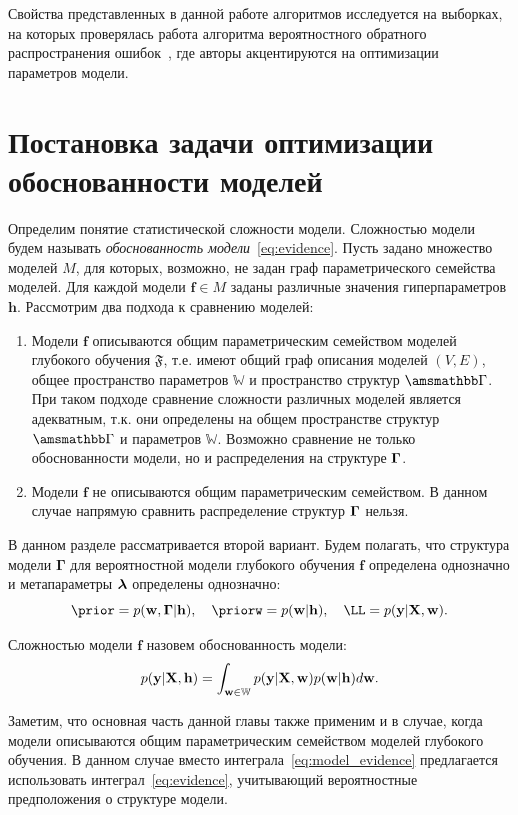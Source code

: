 Свойства представленных в данной работе  алгоритмов исследуется на выборках, на которых проверялась работа алгоритма вероятностного обратного распространения ошибок~\cite{pbp}, где авторы акцентируются на оптимизации параметров модели. 


\section{Постановка задачи оптимизации обоснованности моделей}
Определим понятие статистической сложности модели. Сложностью модели будем называть \textit{обоснованность модели}~\eqref{eq:evidence}.
Пусть задано множество моделей $M$, для которых, возможно, не задан граф параметрического семейства моделей.
Для каждой модели $\mathbf{f} \in {M}$ заданы различные значения гиперпараметров $\mathbf{h}$. 
Рассмотрим два подхода к сравнению моделей:
\begin{enumerate}
\item Модели $\mathbf{f}$ описываются общим параметрическим семейством моделей глубокого обучения $\mathfrak{F}$, т.е. имеют общий граф описания моделей $(V,E)$, общее пространство параметров $\mathbb{W}$ и пространство структур $\Gb$. При таком подходе сравнение сложности различных моделей является  адекватным, т.к. они определены на общем пространстве структур $\Gb$ и параметров $\mathbb{W}$. Возможно сравнение не только обоснованности модели, но и распределения на структуре $\boldsymbol{\Gamma}$.  
\item Модели $\mathbf{f}$  не описываются общим параметрическим семейством. В данном случае напрямую сравнить распределение структур $\boldsymbol{\Gamma}$ нельзя.
\end{enumerate}
В данном разделе рассматривается второй вариант. Будем полагать, что структура модели $\boldsymbol{\Gamma}$ для вероятностной модели глубокого обучения $\mathbf{f}$ определена однозначно и метапараметры $\boldsymbol{\lambda}$ определены однозначно:
\[
    \prior = p(\w,\G|\h), \quad \priorw = p(\w|\h),\quad    \LL = p(\y|\X,\w).
\]

\begin{defin} Сложностью модели $\mathbf{f}$ назовем обоснованность модели:
\begin{equation}
\label{eq:model_evidence}
	p(\mathbf{y}|\mathbf{X},\mathbf{h}) = \int_{\mathbf{w} \in \mathbb{W}} p(\mathbf{y}|\mathbf{X},\mathbf{w})p(\mathbf{w}|\mathbf{h})d\mathbf{w}.
\end{equation}
\end{defin}

Заметим, что основная часть данной главы также применим и в случае, когда модели описываются общим параметрическим семейством моделей глубокого обучения. В данном случае вместо интеграла~\eqref{eq:model_evidence} предлагается использовать интеграл~\eqref{eq:evidence}, учитывающий вероятностные предположения о структуре модели.


